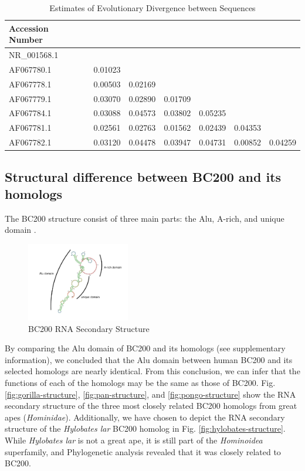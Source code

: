 \documentclass[conference, 11pt]{IEEEtran}
\begin{document}
{\begin{table}[h]
  \centering
  \caption{Estimates of Evolutionary Divergence between Sequences}
  \label{tbl:distances}
  \begin{tabular}{lcccccc}
    \toprule
    Accession Number \\
    \midrule
    NR\_001568.1 \\
    AF067780.1 & 0.01023 \\
    AF067778.1 & 0.00503 & 0.02169 \\
    AF067779.1 & 0.03070 & 0.02890 & 0.01709 \\ 
    AF067784.1 & 0.03088 & 0.04573 & 0.03802 & 0.05235 \\
    AF067781.1 & 0.02561 & 0.02763 & 0.01562 & 0.02439 & 0.04353 \\ 
    AF067782.1 & 0.03120 & 0.04478 & 0.03947 & 0.04731 & 0.00852 & 0.04259 \\
    \bottomrule
  \end{tabular}
\end{table}

\subsection{Structural difference between BC200 and its homologs}\label{sec:results-structure}

The BC200 structure consist of three main parts: the Alu, A-rich, and unique domain \cite{jung2014rna}.

\begin{figure}[h]
  \centering
  \includegraphics[width=0.4\textwidth]{figs/rna-6.png}
  \caption{BC200 RNA Secondary Structure}
  \label{fig:bc200-structure}
\end{figure}

By comparing the Alu domain of BC200 and its homologs (see supplementary information), we concluded that the Alu domain between human BC200 and its selected homologs are nearly identical. 
From this conclusion, we can infer that the functions of each of the homologs may be the same as those of BC200. 
Fig. \ref{fig:gorilla-structure}, \ref{fig:pan-structure}, and \ref{fig:pongo-structure} show the RNA secondary structure of the three most closely related BC200 homologs from great apes (\emph{Hominidae}). 
Additionally, we have chosen to depict the RNA secondary structure of the \emph{Hylobates lar} BC200 homolog in Fig. \ref{fig:hylobates-structure}. 
While \emph{Hylobates lar} is not a great ape, it is still part of the \emph{Hominoidea} superfamily, and Phylogenetic analysis revealed that it was closely related to BC200.

}
\end{document}
